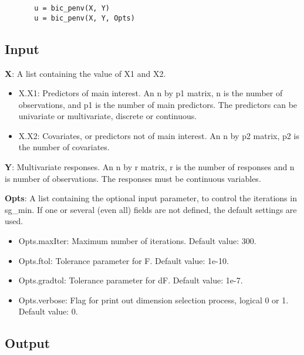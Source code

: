 \documentclass[a4paper,11pt,openany]{memoir}
\begin{document}
\begin{verbatim}       u = bic_penv(X, Y)
       u = bic_penv(X, Y, Opts)\end{verbatim}
    

\subsection*{Input}

\begin{par}
\textbf{X}: A list containing the value of X1 and X2.
\end{par} \vspace{1em}
\begin{itemize}
\setlength{\itemsep}{-1ex}
   \item X.X1: Predictors of main interest. An n by p1 matrix, n is the number of observations, and p1 is the number of main predictors. The predictors can be univariate or multivariate, discrete or continuous.
   \item X.X2: Covariates, or predictors not of main interest.  An n by p2 matrix, p2 is the number of covariates.
\end{itemize}
\begin{par}
\textbf{Y}: Multivariate responses. An n by r matrix, r is the number of responses and n is number of observations. The responses must be continuous variables.
\end{par} \vspace{1em}
\begin{par}
\textbf{Opts}: A list containing the optional input parameter, to control the iterations in sg\_min. If one or several (even all) fields are not defined, the default settings are used.
\end{par} \vspace{1em}
\begin{itemize}
\setlength{\itemsep}{-1ex}
   \item Opts.maxIter: Maximum number of iterations.  Default value: 300.
   \item Opts.ftol: Tolerance parameter for F.  Default value: 1e-10.
   \item Opts.gradtol: Tolerance parameter for dF.  Default value: 1e-7.
   \item Opts.verbose: Flag for print out dimension selection process, logical 0 or 1. Default value: 0.
\end{itemize}


\subsection*{Output}
\end{document}
